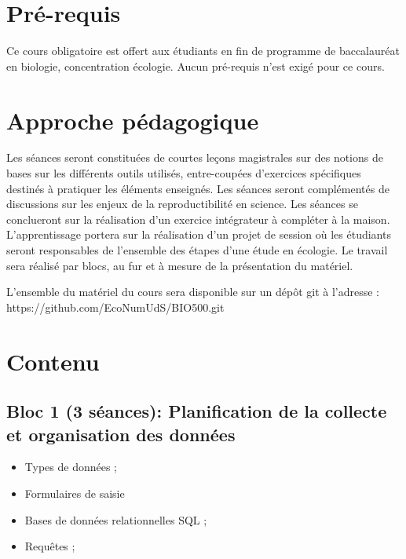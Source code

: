 \documentclass[12]{article}
\begin{document}
	\section*{Pré-requis}

	Ce cours obligatoire est offert aux étudiants en fin de programme de
	baccalauréat en biologie, concentration écologie. Aucun pré-requis n'est
	exigé pour ce cours. 


    \section*{Approche pédagogique} 

	Les séances seront constituées de courtes leçons magistrales sur des notions
	de bases sur les différents outils utilisés, entre-coupées d'exercices
	spécifiques destinés à pratiquer les éléments enseignés. Les séances seront
	complémentés de discussions sur les enjeux de la reproductibilité en science.
	Les séances se conclueront sur la réalisation  d'un exercice intégrateur à
	compléter à la maison. L'apprentissage portera sur la réalisation d'un projet
	de session où les étudiants seront responsables de l'ensemble des étapes d'une
	étude en écologie. Le travail sera réalisé par blocs, au fur et à mesure de la
	présentation du matériel.


	L'ensemble du matériel du cours sera disponible sur un dépôt git à l'adresse :\\
	https://github.com/EcoNumUdS/BIO500.git

	\section*{Contenu}

	\subsection*{Bloc 1 (3 séances): Planification de la collecte et organisation des données}

	\begin{itemize}
	\renewcommand{\labelitemi}{$\bullet$}	
		\item Types de données ;
		\item Formulaires de saisie
		\item Bases de données relationnelles SQL ;
		\item Requêtes ;
	\end{itemize}
\end{document}
